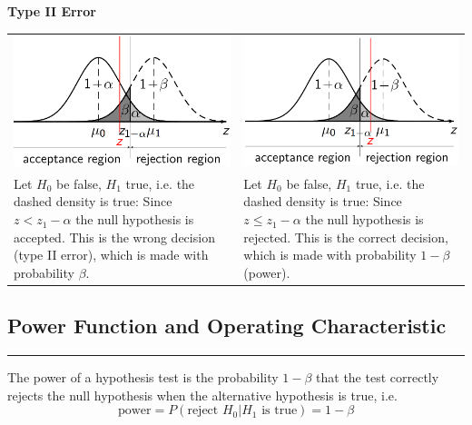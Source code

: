 \textbf{Type II Error}\\
\begin{table}[H]
  \setlength{\tabcolsep}{0.0em}
  \footnotesize
  \begin{tabular}{p{}@{\hskip 1em}p{}}
    \includegraphics[width=\linewidth]{Pics/3.2.3.png}& \includegraphics[width=\linewidth]{Pics/3.2.4.png} \\
    Let $H_0$ be false, $H_1$ true, i.e. the dashed density is true: Since $z < z_1-\alpha$ the null hypothesis is accepted. This is the wrong decision (type II error), which is made with probability $\beta$. &
    Let $H_0$ be false, $H_1$ true, i.e. the dashed density is true: Since $z \leq z_1-\alpha$ the null hypothesis is rejected. This is the correct decision, which is made with probability $1 - \beta$ (power).
  \end{tabular}
\end{table}

\subsection{Power Function and Operating Characteristic}
\noindent\rule[\linienAbstand]{\linewidth}{\linienDicke}
The power of a hypothesis test is the probability $1-\beta$ that the test correctly rejects the null hypothesis when the alternative hypothesis is true, i.e.
\begin{equation}
  \text{power} = P(\text{reject } H_0 | H_1 \text{ is true}) = 1-\beta
\end{equation}

